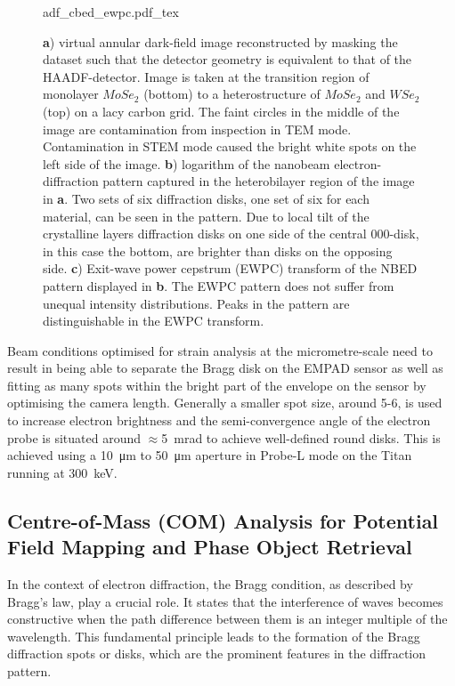 \begin{figure}
	\centering
	\def\svgwidth{0.9\linewidth}
	{adf_cbed_ewpc.pdf_tex}
	\caption{\textbf{a}) virtual annular dark-field image reconstructed by masking the dataset such that the detector geometry is equivalent to that of the HAADF-detector. Image is taken at the transition region of monolayer $MoSe_2$ (bottom) to a heterostructure of $MoSe_2$ and $WSe_2$ (top) on a lacy carbon grid. The faint circles in the middle of the image are contamination from inspection in TEM mode. Contamination in STEM mode caused the bright white spots on the left side of the image. \textbf{b}) logarithm of the nanobeam electron-diffraction pattern captured in the heterobilayer region of the image in \textbf{a}. Two sets of six diffraction disks, one set of six for each material, can be seen in the pattern. Due to local tilt of the crystalline layers diffraction disks on one side of the central $000$-disk, in this case the bottom, are brighter than disks on the opposing side. \textbf{c}) Exit-wave power cepstrum (EWPC) transform of the NBED pattern displayed in \textbf{b}. The EWPC pattern does not suffer from unequal intensity distributions. Peaks in the pattern are distinguishable in the EWPC transform.}
	\label{fig:adf_nbed_ewpc}
\end{figure}

Beam conditions optimised for strain analysis at the micrometre-scale need to result in being able to separate the Bragg disk on the EMPAD sensor as well as fitting as many spots within the bright part of the envelope on the sensor by optimising the camera length. Generally a smaller spot size, around 5-6, is used to increase electron brightness and the semi-convergence angle of the electron probe is situated around $\approx$\SI{5}{\milli\radian} to achieve well-defined round disks. 
%
This is achieved using a \SI{10}{\micro\meter} to \SI{50}{\micro\meter} aperture in Probe-L mode on the Titan running at \SI{300}{\kilo\electronvolt}.



\subsection{Centre-of-Mass (COM) Analysis for Potential Field Mapping and Phase Object Retrieval}
%
In the context of electron diffraction, the Bragg condition, as described by Bragg's law, play a crucial role. It states that the interference of waves becomes constructive when the path difference between them is an integer multiple of the wavelength. This fundamental principle leads to the formation of the Bragg diffraction spots or disks, which are the prominent features in the diffraction pattern.

